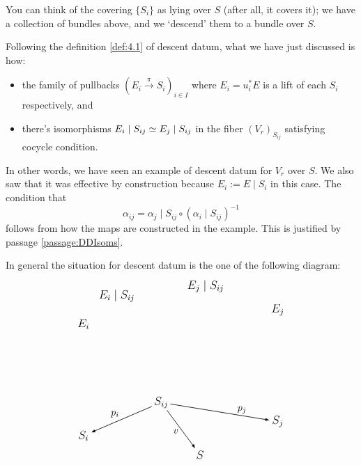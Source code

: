 \documentclass[12pt]{memoir}
\newcounter{passage}
\begin{document}
You can think of the covering $\{S_i\}$ as lying over $S$ (after all, it covers it); we have a collection of bundles above, and we `descend' them to a bundle over $S$.

\begin{ptcb}
    Following the definition \ref{def:4.1} of descent datum, what we have just discussed is how:
    \begin{itemize}
        \item the family of pullbacks \((E_i\xrightarrow{\pi}S_i)_{i\in I}\) where \(E_i=u_i^\ast E\) is a lift of each \(S_i\) respectively, and
        \item there's isomorphisms \( E_i\mid S_{ij}\isom E_j\mid S_{ij}\) in the fiber \((V_r)_{S_{ij}}\) satisfying cocycle condition.
    \end{itemize}
    In other words, we have seen an example of descent datum for \(V_r\) over \(S\). We also saw that it was effective by construction because \(E_i:=E\mid S_i\) in this case. The condition that 
    \[
        \alpha_{ij} = \alpha_j \mid S_{ij} \circ (\alpha_i \mid S_{ij})^{-1}
    \]
    follows from how the maps are constructed in the example. This is justified by passage \ref{passage:DDIsoms}.\par
    In general the situation for descent datum is the one of the following diagram:
    \[
    \begin{tikzpicture}[
        y=.86cm,
        arrows={-{Latex[length=1.6mm]}},
        line width=.6pt,
        every node/.style={inner sep=2pt,font=\large},
        projection/.style={densely dotted,draw=gray!75},
        comparison/.style={draw=noteblue,line width=.8pt}
    ]
        \node (Si)  at (0,0)       {$S_i$};
        \node (Sij) at (2.8,1.4)   {$S_{ij}$};
        \node (Sj)  at (7,.6)      {$S_j$};
        \node (S)   at (4.2,-.8)   {$S$};

        \node (Ei)   at (0,4.7)    {$E_i$};
        \node (Eiij) at (1.2,5.9)  {$E_i\mid S_{ij}$};
        \node (Ejij) at (4.4,6.3)  {$E_j\mid S_{ij}$};
        \node (Ej)   at (7,5.3)    {$E_j$};

        \begin{scope}[every node/.append style={font=\normalsize}]
        \draw (Sij) -- node[above left] {$p_i$} (Si);
        \draw (Sij) -- node[pos=.72,above] {$p_j$} (Sj);
        \draw (Sij) -- node[pos=.55,left,xshift=-.2em] {$v$} (S);


\end{scope}
\end{tikzpicture}\]
\end{ptcb}
\end{document}
